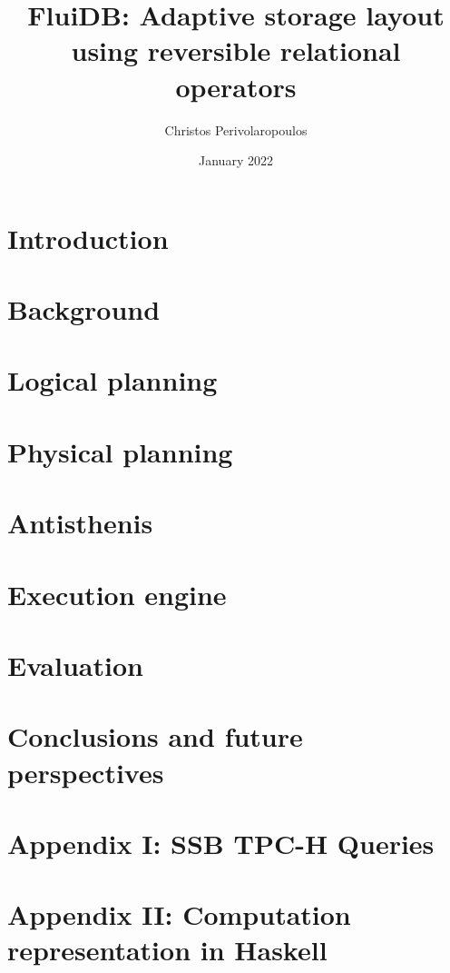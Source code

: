 \documentclass[fontsize=12pt,paper=letter,twosided,cleardoublepage=plain,final]{scrbook}
\title{FluiDB: Adaptive storage layout using reversible relational operators}
\author{Christos Perivolaropoulos}
\date{January 2022}
\begin{document}
\frontmatter


\mainmatter
{}
\chapter{Introduction}
\label{chapter:introduction}


\chapter{Background}
\label{chapter:background}


\chapter{Logical planning}
\label{chapter:fluidb_logical_planning}


\chapter{Physical planning}
\label{chapter:physical_planning}


\chapter{Antisthenis}
\label{chapter:antisthenis}


\chapter{Execution engine}
\label{chapter:execution_engine}


\chapter{Evaluation}
\label{chapter:evaluation}


\chapter{Conclusions and future perspectives}
\label{chapter:conclusion}


\appendix
\chapter{Appendix I: SSB TPC-H Queries}
\label{chapter:appendix}


\chapter{Appendix II: Computation representation in Haskell}
\label{chapter:appendix2}


\begin{spacing}{1}
\printbibliography
\end{spacing}

\backmatter
\end{document}
